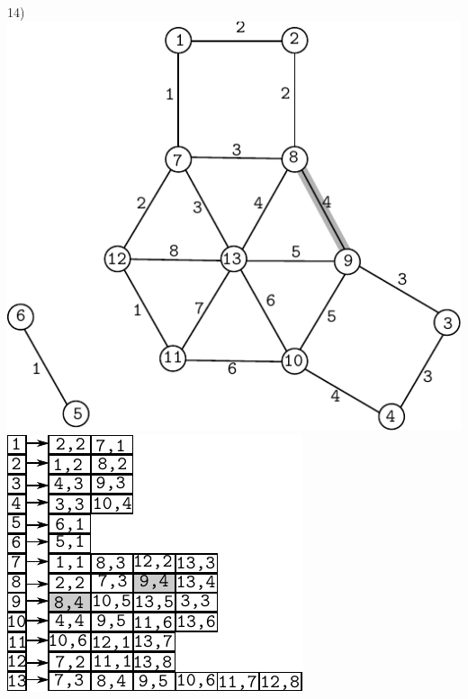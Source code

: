 \documentclass{article}
\begin{document}
\begin{center}
14)\includegraphics[scale=0.6]{bottleneck/g14}
\hspace{5mm}
\includegraphics[scale=0.9]{bottleneck/l14}
\end{center}
\end{document}
